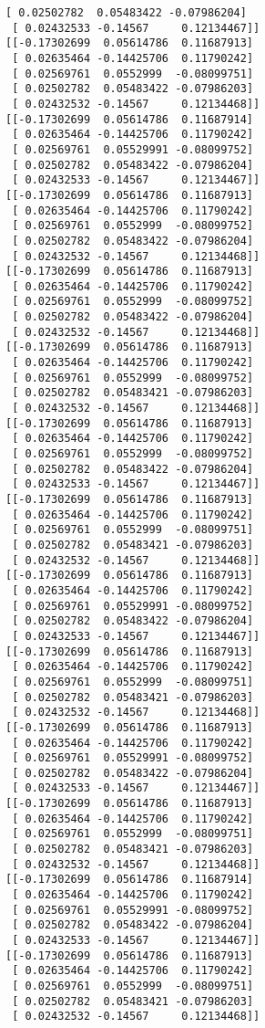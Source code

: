 \documentclass[11pt]{article}
\begin{document}
\begin{Verbatim}[commandchars=\\\{\}]
 [ 0.02502782  0.05483422 -0.07986204]
 [ 0.02432533 -0.14567     0.12134467]]
[[-0.17302699  0.05614786  0.11687913]
 [ 0.02635464 -0.14425706  0.11790242]
 [ 0.02569761  0.0552999  -0.08099751]
 [ 0.02502782  0.05483422 -0.07986203]
 [ 0.02432532 -0.14567     0.12134468]]
[[-0.17302699  0.05614786  0.11687914]
 [ 0.02635464 -0.14425706  0.11790242]
 [ 0.02569761  0.05529991 -0.08099752]
 [ 0.02502782  0.05483422 -0.07986204]
 [ 0.02432533 -0.14567     0.12134467]]
[[-0.17302699  0.05614786  0.11687913]
 [ 0.02635464 -0.14425706  0.11790242]
 [ 0.02569761  0.0552999  -0.08099752]
 [ 0.02502782  0.05483422 -0.07986204]
 [ 0.02432532 -0.14567     0.12134468]]
[[-0.17302699  0.05614786  0.11687913]
 [ 0.02635464 -0.14425706  0.11790242]
 [ 0.02569761  0.0552999  -0.08099752]
 [ 0.02502782  0.05483422 -0.07986204]
 [ 0.02432532 -0.14567     0.12134468]]
[[-0.17302699  0.05614786  0.11687913]
 [ 0.02635464 -0.14425706  0.11790242]
 [ 0.02569761  0.0552999  -0.08099752]
 [ 0.02502782  0.05483421 -0.07986203]
 [ 0.02432532 -0.14567     0.12134468]]
[[-0.17302699  0.05614786  0.11687913]
 [ 0.02635464 -0.14425706  0.11790242]
 [ 0.02569761  0.0552999  -0.08099752]
 [ 0.02502782  0.05483422 -0.07986204]
 [ 0.02432533 -0.14567     0.12134467]]
[[-0.17302699  0.05614786  0.11687913]
 [ 0.02635464 -0.14425706  0.11790242]
 [ 0.02569761  0.0552999  -0.08099751]
 [ 0.02502782  0.05483421 -0.07986203]
 [ 0.02432532 -0.14567     0.12134468]]
[[-0.17302699  0.05614786  0.11687913]
 [ 0.02635464 -0.14425706  0.11790242]
 [ 0.02569761  0.05529991 -0.08099752]
 [ 0.02502782  0.05483422 -0.07986204]
 [ 0.02432533 -0.14567     0.12134467]]
[[-0.17302699  0.05614786  0.11687913]
 [ 0.02635464 -0.14425706  0.11790242]
 [ 0.02569761  0.0552999  -0.08099751]
 [ 0.02502782  0.05483421 -0.07986203]
 [ 0.02432532 -0.14567     0.12134468]]
[[-0.17302699  0.05614786  0.11687913]
 [ 0.02635464 -0.14425706  0.11790242]
 [ 0.02569761  0.05529991 -0.08099752]
 [ 0.02502782  0.05483422 -0.07986204]
 [ 0.02432533 -0.14567     0.12134467]]
[[-0.17302699  0.05614786  0.11687913]
 [ 0.02635464 -0.14425706  0.11790242]
 [ 0.02569761  0.0552999  -0.08099751]
 [ 0.02502782  0.05483421 -0.07986203]
 [ 0.02432532 -0.14567     0.12134468]]
[[-0.17302699  0.05614786  0.11687914]
 [ 0.02635464 -0.14425706  0.11790242]
 [ 0.02569761  0.05529991 -0.08099752]
 [ 0.02502782  0.05483422 -0.07986204]
 [ 0.02432533 -0.14567     0.12134467]]
[[-0.17302699  0.05614786  0.11687913]
 [ 0.02635464 -0.14425706  0.11790242]
 [ 0.02569761  0.0552999  -0.08099751]
 [ 0.02502782  0.05483421 -0.07986203]
 [ 0.02432532 -0.14567     0.12134468]]

\end{Verbatim}
\end{document}
